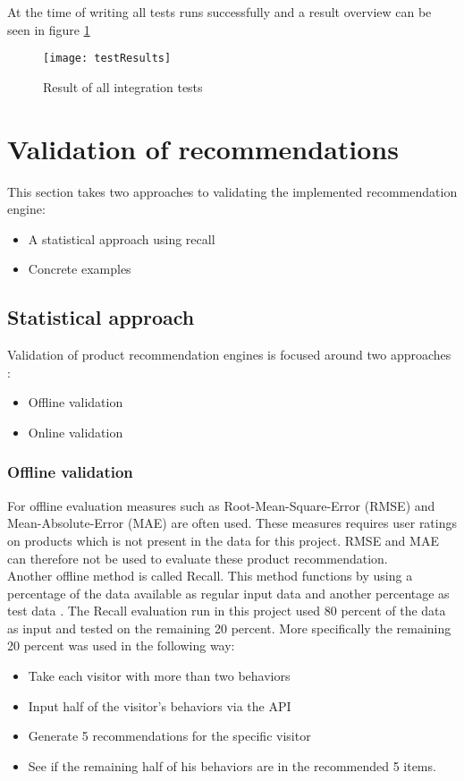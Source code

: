 At the time of writing all tests runs successfully and a result overview can be seen in figure \ref{testResult}
\begin{figure}[H]
\centering
\texttt{[image: testResults]}
\caption{Result of all integration tests}
\label{testResult}
\end{figure}

\section{Validation of recommendations}

This section takes two approaches to validating the implemented recommendation engine:
\begin{itemize}
\item A statistical approach using recall
\item Concrete examples
\end{itemize}

\subsection{Statistical approach}

Validation of product recommendation engines is focused around two approaches \cite{eval}:
\begin{itemize}
\item Offline validation
\item Online validation
\end{itemize}

\subsubsection{Offline validation}

For offline evaluation measures such as Root-Mean-Square-Error (RMSE) and Mean-Absolute-Error (MAE) \cite{rmseAndmae} are often used. These measures requires user ratings on products which is not present in the data for this project. RMSE and MAE can therefore not be used to evaluate these product recommendation. \\
Another offline method is called Recall. This method functions by using a percentage of the data available as regular input data and another percentage as test data \cite{eval}. The Recall evaluation run in this project used 80 percent of the data as input and tested on the remaining 20 percent. More specifically the remaining 20 percent was used in the following way:
\begin{itemize}
\item Take each visitor with more than two behaviors
\item Input half of the visitor's behaviors via the API
\item Generate 5 recommendations for the specific visitor
\item See if the remaining half of his behaviors are in the recommended 5 items.
\end{itemize}

